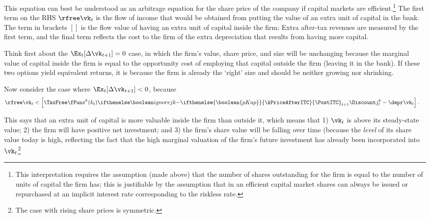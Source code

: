 \documentclass[headings=optiontotocandhead,toc=flat]{handout}
\newcommand{\pkTF}{\ifthenelse{\boolean{pKap}}}
\begin{document}
This equation can best be understood as an arbitrage equation for the
share price of the company if capital markets are
efficient.\footnote{This interpretation requires the assumption (made
  above) that the number of shares outstanding for the firm is equal to
  the number of units of capital the firm has; this is justifiable by
  the assumption that in an efficient capital market shares can always
  be issued or repurchased at an implicit interest rate corresponding
  to the riskless rate.}  The first term on the RHS $\rfree\vk_{t}$ is
the flow of income that would be obtained from putting the value of an
extra unit of capital in the bank.  The term in brackets $[]$ is the
flow value of having an extra unit of capital inside the firm: Extra
after-tax revenues are measured by the first term,  and the final term reflects the cost to the firm of the
extra depreciation that results from having more capital.

Think first about the $\Ex_{t} [\Delta \vk_{t+1}] = 0 $ case, in which
the firm's value, share price, and size will be unchanging
because the marginal value of capital inside the firm is equal to the
opportunity cost of employing that capital outside the firm (leaving
it in the bank). If these two options yield equivalent returns, it is
because the firm is already the `right' size and should be neither
growing nor shrinking.


Now consider the case where $\Ex_{t} [\Delta \vk_{t+1}] < 0$, because
\begin{equation}\begin{gathered}\begin{aligned}
      \rfree \vk_{t} & <   \left[\TaxFree\fFunc^{k}(k_{t})\IfIgnorejk{}{-\pkTF{\kPriceAfterITC}{\PostITC}_{t+1}\Discount j_{t}^{k}}-\depr \vk_{t} \right].
    \end{aligned}\end{gathered}\end{equation}

This says that an extra unit of capital is more valuable inside the
firm than outside it, which means that 1) $\vk_{t}$ is above its
steady-state value; 2) the firm will have positive net investment; and
3) the firm's share value will be falling over time (because the {\it level}
of its share value today is high, reflecting the fact that the high marginal
valuation of the firm's future investment has already been
incorporated into $\vk_{t}$\footnote{The case with rising share prices is
  symmetric.}
\end{document}
